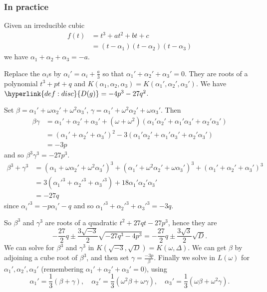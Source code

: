 \documentclass{article}
\begin{document}
\subsubsection*{In practice}
Given an irreducible cubic
\begin{align*}
    f(t) &= t^3 + at^2 + bt + c \\
         &= (t-\alpha_1)(t-\alpha_2)(t-\alpha_3)
\end{align*}
we have $\alpha_1 + \alpha_2 + \alpha_3 = -a$.

Replace the $\alpha_i$s by $\alpha_i' = \alpha_i + \frac{a}{3}$ so that $\alpha_1' + \alpha_2' + \alpha_3' = 0$.
They are roots of a polynomial $t^3 + pt + q$ and $K(\alpha_1,\alpha_2,\alpha_3) = K(\alpha_1',\alpha_2',\alpha_3')$.
We have $\hyperlink{def:disc}{D(g)} = -4p^3 - 27q^2$.

Set $\beta = \alpha_1' + \omega\alpha_2' + \omega^2\alpha_3'$, $\gamma = \alpha_1' + \omega^2 \alpha_2' + \omega \alpha_3'$. Then
\begin{align*}
    \beta\gamma &= \alpha_1' + \alpha_2' + \alpha_3' + (\omega + \omega^2) (\alpha_1'\alpha_2'+\alpha_1'\alpha_3'+\alpha_2'\alpha_3') \\
                &= (\alpha_1'+\alpha_2'+\alpha_3')^2 - 3(\alpha_1'\alpha_2'+\alpha_1'\alpha_3'+\alpha_2'\alpha_3') \\
                &= -3p
\end{align*}
and so $\beta^3 \gamma^3 = -27p^3$.
\begin{align*}
    \beta^3 + \gamma^3 &= (\alpha_1 + \omega \alpha_2' + \omega^2 \alpha_3')^3 + (\alpha_1' + \omega^2 \alpha_2' + \omega \alpha_3')^3 + (\alpha_1'+\alpha_2'+\alpha_3')^3 \\
                       &= 3(\alpha_1'^3 + \alpha_2'^3+\alpha_3'^3) + 18\alpha_1'\alpha_2'\alpha_3' \\
                       &= -27q
\end{align*}
since $\alpha_i'^3 = -p\alpha_i' - q$ and so $\alpha_1'^3 + \alpha_2'^3 + \alpha_3'^3 = -3q$.

So $\beta^3$ and $\gamma^3$ are roots of a quadratic $t^2 + 27qt - 27p^3$, hence they are
\begin{equation*}
    -\frac{27}{2}q \pm \frac{3\sqrt{-3}}{2} \sqrt{-27q^3 - 4p^3} = -\frac{27}{2} q \pm \frac{3 \sqrt{3}}{2} \sqrt{D}.
\end{equation*}
We can solve for $\beta^3$ and $\gamma^3$ in $K(\sqrt{-3}, \sqrt{D}) = K(\omega,\Delta)$.
We can get $\beta$ by adjoining a cube root of $\beta^3$, and then set $\gamma = \frac{-3p}{\beta}$.
Finally we solve in $L(\omega)$ for $\alpha_1', \alpha_2', \alpha_3'$ (remembering $\alpha_1'+\alpha_2'+\alpha_3'=0)$, using
\begin{equation*}
    \alpha_1' = \frac{1}{3}(\beta+\gamma), \quad \alpha_2' = \frac{1}{3}(\omega^2 \beta+\omega \gamma), \quad \alpha_3' = \frac{1}{3}(\omega\beta+\omega^2\gamma).
\end{equation*}
\end{document}
